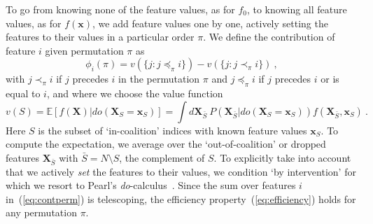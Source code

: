 \documentclass{article}
\newcommand{\vX}{\mathbf{X}}
\newcommand{\vx}{\mathbf{x}}
\newcommand{\expectation}{\mathbb{E}}
\newcommand{\contribution}{{\phi}}
\newcommand{\val}{{v}}
\newcommand{\dodo}{\mathit{do}}
\newcommand{\lvdo}[1]{\dodo(\vX_{#1} = \vx_{#1})}
\newcommand{\perm}{\pi}
\newcommand{\operator}{\mathit{op}}
\newcommand{\allfeatures}{{N}}
\begin{document}
To go from knowing none of the feature values, as for $f_0$, to knowing all feature values, as for $f(\vx)$, we add feature values one by one, actively setting the features to their values in a particular order $\perm$.
We define the contribution of feature $i$ given permutation $\perm$ as
\begin{equation}
\contribution_i(\perm) = \val(\{j: j \preceq_\perm i\}) - \val(\{j: j \prec_\perm i\}) \: ,
\label{eq:contperm}
\end{equation}
with $j \prec_\perm i$ if $j$ precedes $i$ in the permutation $\perm$ and $j \preceq_\perm i$ if $j$ precedes $i$ or is equal to $i$, and where we choose the value function
\begin{equation}
\val(S) = \expectation \left[f(\vX) | \lvdo{S} \right] = \int d\vX_{\bar{S}} \: P(\vX_{\bar{S}}|\lvdo{S}) f(\vX_{\bar{S}},\vx_S) \: .
\label{eq:valuedef}
\end{equation}
Here $S$ is the subset of `in-coalition' indices with known feature values $\vx_S$. To compute the expectation, we average over the `out-of-coalition' or dropped features $\vX_{\bar{S}}$ with $\bar{S} = \allfeatures \setminus S$, the complement of $S$. To explicitly take into account that we actively {\em set} the features to their values, we condition `by intervention' 
for which we resort to Pearl's \textit{do}-calculus~\cite{pearl1995causal}. Since the sum over features $i$ in~(\ref{eq:contperm}) is telescoping, the efficiency property~(\ref{eq:efficiency}) holds for any permutation $\perm$.
\end{document}
